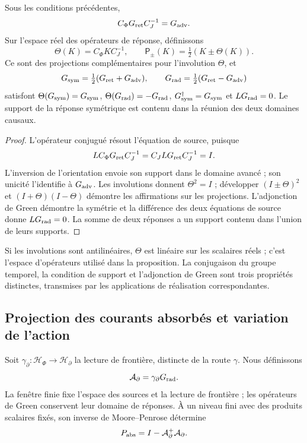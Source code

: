 \begin{proposition}
\label{vii:vii:prop:green-paridades}
Sous les conditions précédentes,
\[
 C_\Phi G_{\rm ret}C_J^{-1}=G_{\rm adv}.
\]
Sur l'espace réel des opérateurs de réponse, définissons
\[
 \Theta(K)=C_\Phi K C_J^{-1},\qquad
 \mathsf P_\pm(K)=\tfrac12(K\pm\Theta(K)).
\]
Ce sont des projections complémentaires pour l'involution \(\Theta\), et
\begin{equation}
 G_{\rm sym}=\tfrac12(G_{\rm ret}+G_{\rm adv}),\qquad
 G_{\rm rad}=\tfrac12(G_{\rm ret}-G_{\rm adv})
 \label{vii:vii:eq:descomposicion-green}
\end{equation}
satisfont \(\Theta(G_{\rm sym})=G_{\rm sym}\),
\(\Theta(G_{\rm rad})=-G_{\rm rad}\),
\(G_{\rm sym}^{\dagger}=G_{\rm sym}\) et
\(LG_{\rm rad}=0\). Le support de la réponse symétrique est contenu
dans la réunion des deux domaines causaux.
\end{proposition}
\begin{proof}
L'opérateur conjugué résout l'équation de source, puisque
\[
 LC_\Phi G_{\rm ret}C_J^{-1}=C_JLG_{\rm ret}C_J^{-1}=I.
\]
L'inversion de l'orientation envoie son support dans le domaine avancé ;
son unicité l'identifie à \(G_{\rm adv}\). Les involutions donnent
\(\Theta^2=I\) ; développer \((I\pm\Theta)^2\) et
\((I+\Theta)(I-\Theta)\) démontre les affirmations sur les projections.
L'adjonction de Green démontre la symétrie et la différence des deux
équations de source donne \(LG_{\rm rad}=0\). La somme de deux réponses
a un support contenu dans l'union de leurs supports.
\end{proof}

Si les involutions sont antilinéaires, \(\Theta\) est linéaire sur les scalaires réels ; c'est l'espace d'opérateurs utilisé dans la proposition. La conjugaison du groupe temporel, la condition de support et l'adjonction de Green sont trois propriétés distinctes, transmises par les applications de réalisation correspondantes.

\subsection{Projection des courants absorbés et variation de l'action}
\label{vii:vii:subsec:proyeccion-absorcion}

Soit \(\gamma_\partial:\mathcal H_\Phi\to\mathcal H_\partial\)
la lecture de frontière, distincte de la route \(\gamma\). Nous définissons
\[
 \mathcal A_\partial=\gamma_\partial G_{\rm rad}.
\]
La fenêtre finie fixe l'espace des sources et la lecture de frontière ;
les opérateurs de Green conservent leur domaine de réponses. À un niveau fini avec
des produits scalaires fixés, son inverse de
Moore--Penrose détermine
\begin{equation}
 P_{\rm abs}=I-\mathcal A_\partial^+\mathcal A_\partial.
 \label{vii:vii:eq:proyector-absorcion}
\end{equation}

